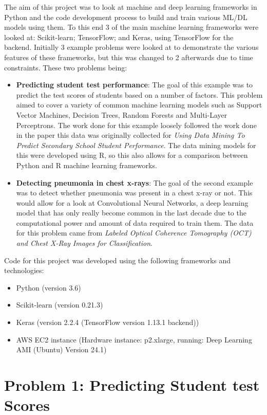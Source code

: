 \documentclass[12pt,a4paper,titlepage,twoside]{report}
\begin{document}
	The aim of this project was to look at machine and deep learning frameworks in Python and the code development process to build and train various ML/DL models using them. To this end 3 of the main machine learning frameworks were looked at: Scikit-learn\cite{scikit-learn}; TensorFlow\cite{tensorflow}; and Keras\cite{keras}, using TensorFlow for the backend. Initially 3 example problems were looked at to demonstrate the various features of these frameworks, but this was changed to 2 afterwards due to time constraints. These two problems being:
	\begin{itemize}
	\item \textbf{Predicting student test performance}: The goal of this example was to predict the test scores of students based on a number of factors. This problem aimed to cover a variety of common machine learning models such as Support Vector Machines, Decision Trees, Random Forests and Multi-Layer Perceptrons. The work done for this example loosely followed the work done in the paper this data was originally collected for \textit{Using Data Mining To Predict Secondary School Student Performance}\cite{student-dataset}. The data mining models for this were developed using R, so this also allows for a comparison between Python and R machine learning frameworks.
	\item \textbf{Detecting pneumonia in chest x-rays}: The goal of the second example was to detect whether pneumonia was present in a chest x-ray or not. This would allow for a look at Convolutional Neural Networks, a deep learning model that has only really become common in the last decade due to the computational power and amount of data required to train them. The data for this problem came from \textit{Labeled Optical Coherence Tomography (OCT) and Chest X-Ray Images for Classification}\cite{pne-dataset}.
	\end{itemize}
	Code for this project was developed using the following frameworks and technologies:
	\begin{itemize}
	\item Python (version 3.6)
	\item Scikit-learn (version 0.21.3)
	\item Keras (version 2.2.4 (TensorFlow version 1.13.1 backend))
	\item AWS EC2 instance (Hardware instance: p2.xlarge, running: Deep Learning AMI (Ubuntu) Version 24.1)
	\end{itemize}
	
	
\chapter{Problem 1: Predicting Student test Scores}
\end{document}
